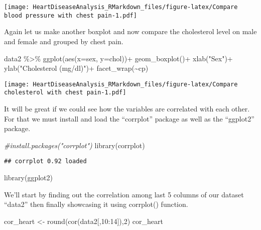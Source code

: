 \documentclass[
]{article}
\newenvironment{Shaded}{\begin{snugshade}}{\end{snugshade}}
\newcommand{\AttributeTok}[1]{\textcolor[rgb]{0.77,0.63,0.00}{#1}}
\newcommand{\CommentTok}[1]{\textcolor[rgb]{0.56,0.35,0.01}{\textit{#1}}}
\newcommand{\DecValTok}[1]{\textcolor[rgb]{0.00,0.00,0.81}{#1}}
\newcommand{\FunctionTok}[1]{\textcolor[rgb]{0.00,0.00,0.00}{#1}}
\newcommand{\NormalTok}[1]{#1}
\newcommand{\OtherTok}[1]{\textcolor[rgb]{0.56,0.35,0.01}{#1}}
\newcommand{\SpecialCharTok}[1]{\textcolor[rgb]{0.00,0.00,0.00}{#1}}
\newcommand{\StringTok}[1]{\textcolor[rgb]{0.31,0.60,0.02}{#1}}
\begin{document}
\texttt{[image: HeartDiseaseAnalysis\_RMarkdown\_files/figure-latex/Compare blood pressure with chest pain-1.pdf]}

Again let us make another boxplot and now compare the cholesterol level
on male and female and grouped by chest pain.

\begin{Shaded}
\begin{Highlighting}[]
\NormalTok{data2 }\SpecialCharTok{\%\textgreater{}\%} 
  \FunctionTok{ggplot}\NormalTok{(}\FunctionTok{aes}\NormalTok{(}\AttributeTok{x=}\NormalTok{sex, }\AttributeTok{y=}\NormalTok{chol))}\SpecialCharTok{+}
  \FunctionTok{geom\_boxplot}\NormalTok{()}\SpecialCharTok{+}
  \FunctionTok{xlab}\NormalTok{(}\StringTok{"Sex"}\NormalTok{)}\SpecialCharTok{+}
  \FunctionTok{ylab}\NormalTok{(}\StringTok{"Cholesterol (mg/dl)"}\NormalTok{)}\SpecialCharTok{+}
  \FunctionTok{facet\_wrap}\NormalTok{(}\SpecialCharTok{\textasciitilde{}}\NormalTok{cp)}
\end{Highlighting}
\end{Shaded}

\texttt{[image: HeartDiseaseAnalysis\_RMarkdown\_files/figure-latex/Compare cholesterol with chest pain-1.pdf]}

It will be great if we could see how the variables are correlated with
each other. For that we must install and load the ``corrplot'' package
as well as the ``ggplot2'' package.

\begin{Shaded}
\begin{Highlighting}[]
\CommentTok{\#install.packages("corrplot")}
\FunctionTok{library}\NormalTok{(corrplot)}
\end{Highlighting}
\end{Shaded}

\begin{verbatim}
## corrplot 0.92 loaded
\end{verbatim}

\begin{Shaded}
\begin{Highlighting}[]
\FunctionTok{library}\NormalTok{(ggplot2)}
\end{Highlighting}
\end{Shaded}

We'll start by finding out the correlation among last 5 columns of our
dataset ``data2'' then finally showcasing it using corrplot() function.

\begin{Shaded}
\begin{Highlighting}[]
\NormalTok{cor\_heart }\OtherTok{\textless{}{-}} \FunctionTok{round}\NormalTok{(}\FunctionTok{cor}\NormalTok{(data2[,}\DecValTok{10}\SpecialCharTok{:}\DecValTok{14}\NormalTok{]),}\DecValTok{2}\NormalTok{) }
\NormalTok{cor\_heart}
\end{Highlighting}
\end{Shaded}
\end{document}
